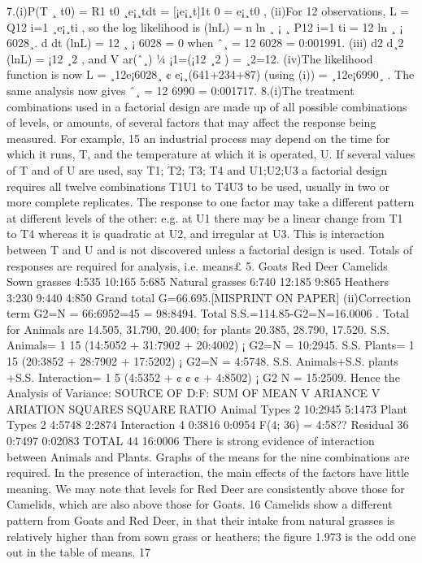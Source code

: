 7.(i)P(T ¸ t0) =
R1
t0
¸e¡¸tdt = [¡e¡¸t]1t
0 = e¡¸t0 ,
(ii)For 12 observations, L =
Q12
i=1
¸e¡¸ti , so the log likelihood is (lnL) = n ln ¸ ¡ ¸
P12
i=1
ti =
12 ln ¸ ¡ 6028¸.
d
dt (lnL) = 12
¸ ¡ 6028 = 0 when ˆ¸ = 12
6028 = 0:001991.
(iii) d2
d¸2 (lnL) = ¡12
¸2 , and V ar(ˆ¸) ¼ ¡1=(¡12
¸2 ) = ¸2=12.
(iv)The likelihood function is now
L = ¸12e¡6028¸ ¢ e¡¸(641+234+87) (using (i))
= ¸12e¡6990¸
.
The same analysis now gives ˆ¸ = 12
6990 = 0:001717.
8.(i)The treatment combinations used in a factorial design are made up of all possible combinations
of levels, or amounts, of several factors that may affect the response being measured. For example,
15
an industrial process may depend on the time for which it runs, T, and the temperature at which it
is operated, U. If several values of T and of U are used, say T1; T2; T3; T4 and U1;U2;U3 a factorial
design requires all twelve combinations T1U1 to T4U3 to be used, usually in two or more complete
replicates.
The response to one factor may take a different pattern at different levels of the other: e.g. at
U1 there may be a linear change from T1 to T4 whereas it is quadratic at U2, and irregular at U3.
This is interaction between T and U and is not discovered unless a factorial design is used.
Totals of responses are required for analysis, i.e. means£ 5.
Goats Red Deer Camelids
Sown grasses 4:535 10:165 5:685
Natural grasses 6:740 12:185 9:865
Heathers 3:230 9:440 4:850
Grand total G=66.695.[MISPRINT ON PAPER]
(ii)Correction term G2=N = 66:6952=45 = 98:8494.
Total S.S.=114.85-G2=N=16.0006 .
Total for Animals are 14.505, 31.790, 20.400; for plants 20.385, 28.790, 17.520.
S.S. Animals= 1
15 (14:5052 + 31:7902 + 20:4002) ¡ G2=N = 10:2945.
S.S. Plants= 1
15 (20:3852 + 28:7902 + 17:5202) ¡ G2=N = 4:5748.
S.S. Animals+S.S. plants +S.S. Interaction= 1
5 (4:5352 + ¢ ¢ ¢ + 4:8502) ¡ G2
N = 15:2509.
Hence the Analysis of Variance:
SOURCE OF D:F: SUM OF MEAN V ARIANCE
V ARIATION SQUARES SQUARE RATIO
Animal Types 2 10:2945 5:1473
Plant Types 2 4:5748 2:2874
Interaction 4 0:3816 0:0954 F(4; 36) = 4:58??
Residual 36 0:7497 0:02083
TOTAL 44 16:0006
There is strong evidence of interaction between Animals and Plants. Graphs of the means for
the nine combinations are required.
In the presence of interaction, the main effects of the factors have little meaning. We may
note that levels for Red Deer are consistently above those for Camelids, which are also above those
for Goats.
16
Camelids show a different pattern from Goats and Red Deer, in that their intake from natural
grasses is relatively higher than from sown grass or heathers; the figure 1.973 is the odd one out
in the table of means.
17